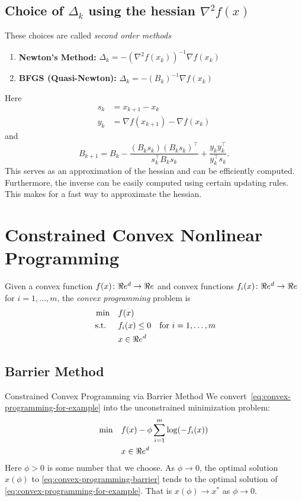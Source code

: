 \subsection{Choice of $\Delta_k$ using the hessian $\nabla^2 f(x)$}
These choices are called \emph{second order methods}
\begin{enumerate}
\item \textbf{Newton's Method:}   $\Delta_k = - (\nabla^2f(x_k))^{-1} \nabla f(x_k)$
\item \textbf{BFGS (Quasi-Newton):} $\Delta_k = - (B_k)^{-1} \nabla f(x_k)$
\end{enumerate}
Here
\begin{align*}
s_k &= x_{k+1} - x_k\\
y_k &= \nabla f(x_{k+1}) - \nabla f(x_k)
\end{align*}
and
$$
B_{k+1} = B_k - \frac{(B_k s_k)(B_k s_k)^\top}{s_k^\top B_k s_k} + \frac{y_k y_k^\top}{y_k^\top s_k}.
$$
This serves as an approximation of the hessian and can be efficiently computed.  Furthermore,  the inverse can be easily computed using certain updating rules.  This makes for a fast way to approximate the hessian.



\section{Constrained Convex Nonlinear Programming}
Given a convex function $f(x)\colon \Re e^d \to \Re e$ and convex functions $f_i(x)\colon \Re e^d \to \Re e$ for $i=1, \dots, m$,  the \emph{convex programming} problem is
\begin{equation}
\label{eq:convex-programming-for-example}
\begin{aligned}
\min \quad & f(x)\\
\mbox{ s.t. } \quad  & f_i(x) \leq 0 & \mbox{for } i=1, \dots, m\\
& x \in \Re e^d
\end{aligned}
\end{equation}

\subsection{Barrier Method}
\begin{general}{Constrained Convex Programming via Barrier Method}{}
We convert~\ref{eq:convex-programming-for-example} into the unconstrained minimization problem:
\begin{equation}
\label{eq:convex-programming-barrier}
\begin{aligned}
\min \quad & f(x) - \phi \sum_{i=1}^m \log(-f_i(x)) \\
& x \in \Re e^d
\end{aligned}
\end{equation}
Here $\phi > 0$ is some number that we choose.  As $\phi \to 0$, the optimal solution $x(\phi)$ to \eqref{eq:convex-programming-barrier} tends to the optimal solution of \eqref{eq:convex-programming-for-example}.  That is $x(\phi) \to x^*$ as $\phi \to 0$.
\end{general}

